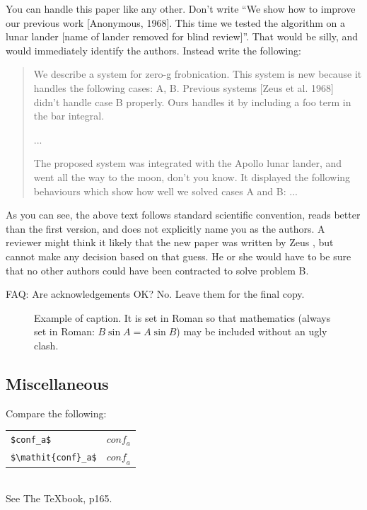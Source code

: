 You can handle this paper like any other.
Don't write ``We show how to improve our previous work [Anonymous, 1968].
This time we tested the algorithm on a lunar lander [name of lander removed for blind review]''.
That would be silly, and would immediately identify the authors.
Instead write the following:
\begin{quotation}
\noindent
We describe a system for zero-g frobnication.
This system is new because it handles the following cases: A, B.  Previous systems [Zeus et al. 1968] didn't handle case B properly.
Ours handles it by including a foo term in the bar integral.

...

The proposed system was integrated with the Apollo lunar lander, and went all the way to the moon, don't you know.
It displayed the following behaviours which show how well we solved cases A and B: ...
\end{quotation}

As you can see, the above text follows standard scientific convention, reads better than the first version, and does not explicitly name you as the authors.
A reviewer might think it likely that the new paper was written by Zeus \etal, but cannot make any decision based on that guess.
He or she would have to be sure that no other authors could have been contracted to solve problem B.

FAQ: Are acknowledgements OK?  No.  Leave them for the final copy.


\begin{figure}[t]
\begin{center}
\fbox{\rule{0pt}{2in} \rule{0.9\linewidth}{0pt}}
\end{center}
   \caption{Example of caption.  It is set in Roman so that mathematics
   (always set in Roman: $B \sin A = A \sin B$) may be included without an
   ugly clash.}
\label{fig:long}
\label{fig:onecol}
\end{figure}

\subsection{Miscellaneous}

\noindent
Compare the following:\\
\begin{tabular}{ll}
 \verb'$conf_a$' &  $conf_a$ \\
 \verb'$\mathit{conf}_a$' & $\mathit{conf}_a$
\end{tabular}\\
See The \TeX book, p165.

